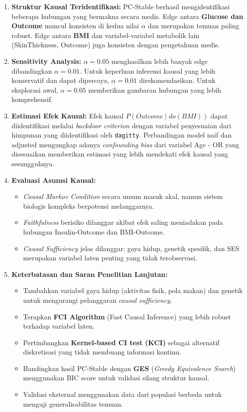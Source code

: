 \documentclass[
  11pt,
]{article}
\providecommand{\tightlist}{%
  \setlength{\itemsep}{0pt}\setlength{\parskip}{0pt}}
\begin{document}
\begin{enumerate}
\def\labelenumi{\arabic{enumi}.}
\item
  \textbf{Struktur Kausal Teridentifikasi:} PC-Stable berhasil
  mengidentifikasi beberapa hubungan yang bermakna secara medis. Edge
  antara \textbf{Glucose dan Outcome} muncul konsisten di kedua nilai
  \(\alpha\) dan merupakan temuan paling robust. Edge antara
  \textbf{BMI} dan variabel-variabel metabolik lain (SkinThickness,
  Outcome) juga konsisten dengan pengetahuan medis.
\item
  \textbf{Sensitivity Analysis:} \(\alpha = 0.05\) menghasilkan lebih
  banyak edge dibandingkan \(\alpha = 0.01\). Untuk keperluan inferensi
  kausal yang lebih konservatif dan dapat dipercaya, \(\alpha = 0.01\)
  direkomendasikan. Untuk eksplorasi awal, \(\alpha = 0.05\) memberikan
  gambaran hubungan yang lebih komprehensif.
\item
  \textbf{Estimasi Efek Kausal:} Efek kausal \(P(Outcome \mid do(BMI))\)
  dapat diidentifikasi melalui \emph{backdoor criterion} dengan variabel
  penyesuaian dari himpunan yang diidentifikasi oleh \texttt{dagitty}.
  Perbandingan model naif dan adjusted mengungkap adanya
  \emph{confounding bias} dari variabel Age - OR yang disesuaikan
  memberikan estimasi yang lebih mendekati efek kausal yang
  sesungguhnya.
\item
  \textbf{Evaluasi Asumsi Kausal:}

  \begin{itemize}
  \tightlist
  \item
    \emph{Causal Markov Condition} secara umum masuk akal, namun sistem
    biologis kompleks berpotensi melanggarnya.
  \item
    \emph{Faithfulness} berisiko dilanggar akibat efek saling meniadakan
    pada hubungan Insulin-Outcome dan BMI-Outcome.
  \item
    \emph{Causal Sufficiency} jelas dilanggar: gaya hidup, genetik
    spesifik, dan SES merupakan variabel laten penting yang tidak
    terobservasi.
  \end{itemize}
\item
  \textbf{Keterbatasan dan Saran Penelitian Lanjutan:}

  \begin{itemize}
  \tightlist
  \item
    Tambahkan variabel gaya hidup (aktivitas fisik, pola makan) dan
    genetik untuk mengurangi pelanggaran \emph{causal sufficiency}.
  \item
    Terapkan \textbf{FCI Algorithm} (Fast Causal Inference) yang lebih
    robust terhadap variabel laten.
  \item
    Pertimbangkan \textbf{Kernel-based CI test (KCI)} sebagai alternatif
    diskretisasi yang tidak membuang informasi kontinu.
  \item
    Bandingkan hasil PC-Stable dengan \textbf{GES} (\emph{Greedy
    Equivalence Search}) menggunakan BIC score untuk validasi silang
    struktur kausal.
  \item
    Validasi eksternal menggunakan data dari populasi berbeda untuk
    menguji generalisabilitas temuan.
  \end{itemize}
\end{enumerate}
\end{document}
